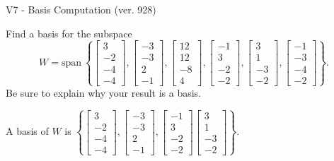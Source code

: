 \begin{exercise}
  \begin{exerciseTitle}V7 - Basis Computation (ver. 928)\end{exerciseTitle}
  \begin{exerciseStatement}
    Find a basis for the subspace 
\[W=\mathrm{span}\ \left\{\left[\begin{array}{r}
3 \\
-2 \\
-4 \\
-4
\end{array}\right] , \left[\begin{array}{r}
-3 \\
-3 \\
2 \\
-1
\end{array}\right] , \left[\begin{array}{r}
12 \\
12 \\
-8 \\
4
\end{array}\right] , \left[\begin{array}{r}
-1 \\
3 \\
-2 \\
-2
\end{array}\right] , \left[\begin{array}{r}
3 \\
1 \\
-3 \\
-2
\end{array}\right] , \left[\begin{array}{r}
-1 \\
-3 \\
-4 \\
-2
\end{array}\right]\right\}.\]
 Be sure to explain why your result is a basis.


  \end{exerciseStatement}
  \begin{exerciseAnswer}
   A basis of \(W\) is  \(\left\{\left[\begin{array}{r}
3 \\
-2 \\
-4 \\
-4
\end{array}\right] , \left[\begin{array}{r}
-3 \\
-3 \\
2 \\
-1
\end{array}\right] , \left[\begin{array}{r}
-1 \\
3 \\
-2 \\
-2
\end{array}\right] \left[\begin{array}{r}
3 \\
1 \\
-3 \\
-2
\end{array}\right]\right\}\).
  


  \end{exerciseAnswer}
\end{exercise}